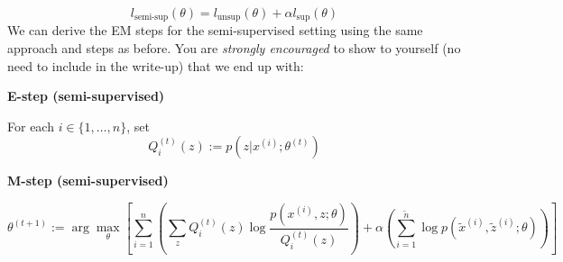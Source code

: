 \documentclass{article}
\begin{document}
\[
l_{\text{semi-sup}}(\theta) = l_{\text{unsup}}(\theta) + \alpha l_{\text{sup}}(\theta)
\]
We can derive the EM steps for the semi-supervised setting using the same approach and steps as before. You are \emph{strongly encouraged} to show to yourself (no need to include in the write-up) that we end up with:

\textbf{E-step (semi-supervised)}

For each $i \in \{1,\ldots,n\}$, set
\[
Q_i^{(t)}(z) := p(z|x^{(i)}; \theta^{(t)})
\]

\textbf{M-step (semi-supervised)}

\[
\theta^{(t+1)} := \arg\max_{\theta} \left[\sum_{i=1}^{n} \left(\sum_{z}Q_i^{(t)}(z)\log \frac{p(x^{(i)},z;\theta)}{Q_i^{(t)}(z)}\right)   + \alpha \left(\sum_{i=1}^{\tilde{n}} \log p(\tilde{x}^{(i)}, \tilde{z}^{(i)}; \theta)\right)\right]
\]
\end{document}
